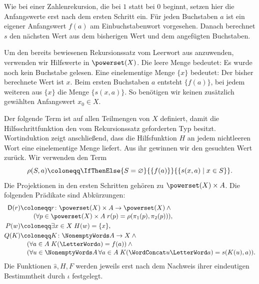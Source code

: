 Wie bei einer Zahlenrekursion, die bei \(1\) statt bei \(0\) beginnt,
setzen hier die Anfangswerte erst nach dem ersten Schritt ein. Für
jeden Buchstaben \(a\) ist ein eigener Anfangswert \(f(a)\) am
Einbuchstabenwort vorgesehen. Danach berechnet \(s\) den nächsten Wert
aus dem bisherigen Wert und dem angefügten Buchstaben.

Um den bereits bewiesenen Rekursionssatz vom Leerwort aus anzuwenden,
verwenden wir Hilfswerte in \(\powerset(X)\). Die leere Menge bedeutet:
Es wurde noch kein Buchstabe gelesen. Eine einelementige Menge
\(\{x\}\) bedeutet: Der bisher berechnete Wert ist \(x\).
Beim ersten Buchstaben \(a\) entsteht \(\{f(a)\}\), bei jedem
weiteren aus \(\{x\}\) die Menge \(\{s(x,a)\}\). So benötigen
wir keinen zusätzlich gewählten Anfangswert \(x_0\in X\).

Der folgende Term ist auf allen Teilmengen von \(X\) definiert, damit
die Hilfsschrittfunktion den vom Rekursionssatz geforderten Typ besitzt.
Wortinduktion zeigt anschließend, dass die Hilfsfunktion \(H\) an jedem
nichtleeren Wort eine einelementige Menge liefert. Aus ihr gewinnen wir
den gesuchten Wert zurück. Wir verwenden den Term
\[
 \rho(S,a)\coloneqq\IfThenElse{S=\varnothing}{\{f(a)\}}
   {\{s(x,a)\mid x\in S\}}.
\]
Die Projektionen in den ersten Schritten gehören zu
\(\powerset(X)\times A\). Die folgenden Prädikate sind Abkürzungen:
\[
\begin{aligned}
 \mathsf D(r)&\coloneqq r\colon\powerset(X)\times A\to\powerset(X)\land{}\\[-2pt]
 &\qquad(\forall p\in\powerset(X)\times A\;r(p)=\rho(\pi_1(p),\pi_2(p))),\\
 P(w)&\coloneqq\exists x\in X\;H(w)=\{x\},\\
 Q(K)&\coloneqq K\colon\NonemptyWords A\to X\land{}\\[-2pt]
 &\quad(\forall a\in A\;K(\LetterWord a)=f(a))\land{}\\[-2pt]
 &\quad(\forall u\in\NonemptyWords A\,\forall a\in A\;
 K(\WordConcat u{\LetterWord a})=s(K(u),a)).
\end{aligned}
\]
Die Funktionen \(\widehat s,H,F\) werden jeweils erst nach dem
Nachweis ihrer eindeutigen Bestimmtheit durch \(\iota\) festgelegt.
